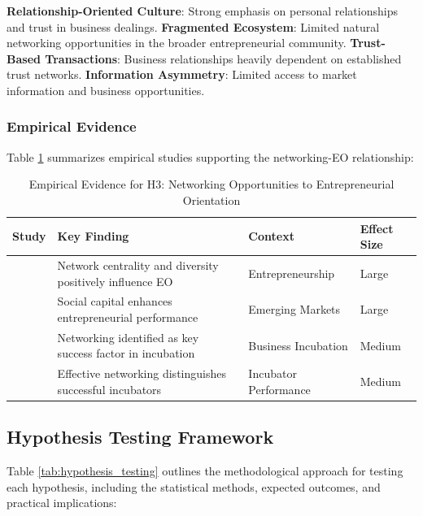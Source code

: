 \documentclass[../Main.tex]{subfiles}
\begin{document}
    \textbf{Relationship-Oriented Culture}: Strong emphasis on personal relationships and trust in business dealings. 
    \textbf{Fragmented Ecosystem}: Limited natural networking opportunities in the broader entrepreneurial community. 
    \textbf{Trust-Based Transactions}: Business relationships heavily dependent on established trust networks. 
    \textbf{Information Asymmetry}: Limited access to market information and business opportunities.

    \subsubsection{Empirical Evidence}
    Table \ref{tab:h3_evidence} summarizes empirical studies supporting the networking-EO relationship:

    \begin{table}[H]
        \centering
        \caption{Empirical Evidence for H3: Networking Opportunities to Entrepreneurial Orientation}
        \label{tab:h3_evidence}
        \begin{tabular}{|p{3cm}|p{4cm}|p{3cm}|p{2cm}|}
            \hline
            \textbf{Study} & \textbf{Key Finding} & \textbf{Context} & \textbf{Effect Size} \\
            \hline
            \autocite{stam2008entrepreneurial} & Network centrality and diversity positively influence EO & Entrepreneurship & Large \\
            \hline
            \autocite{batjargal2003social} & Social capital enhances entrepreneurial performance & Emerging Markets & Large \\
            \hline
            \autocite{theodorakopoulos2014business} & Networking identified as key success factor in incubation & Business Incubation & Medium \\
            \hline
            \autocite{harper2018makes} & Effective networking distinguishes successful incubators & Incubator Performance & Medium \\
            \hline
        \end{tabular}
    \end{table}

    \subsection{Hypothesis Testing Framework}
    Table \ref{tab:hypothesis_testing} outlines the methodological approach for testing each hypothesis, including the statistical methods, expected outcomes, and practical implications:
\end{document}
